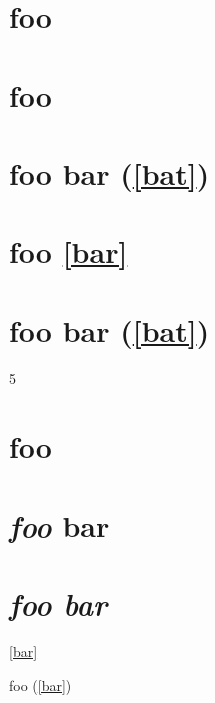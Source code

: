 \part{foo  }
\label{bar}

\part{foo}
\label{bar}

\part{foo bar (\autoref{bat})}
\label{foobarbat}

\part{foo \autoref{bar} }
\label{bat}

\part{foo bar (\autoref{bat})}
\label{baz}

5

\part{foo }
\label{bar}

\part{\emph{foo} bar }
\label{foobar}

\part{\emph{foo
bar}}
\label{foobar}

\autoref{bar}

foo (\autoref{bar})
